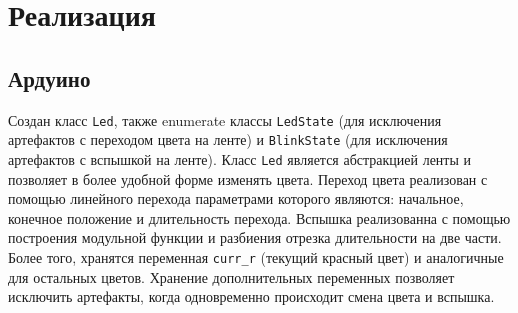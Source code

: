 \section*{Реализация}

\subsection*{Ардуино}
Создан класс \verb|Led|, также enumerate классы \verb|LedState| (для исключения артефактов с переходом цвета на ленте) и \verb|BlinkState| (для исключения артефактов с вспышкой на ленте). Класс \verb|Led| является абстракцией ленты и позволяет в более удобной форме изменять цвета. Переход цвета реализован с помощью линейного перехода параметрами которого являются: начальное, конечное положение и длительность перехода. Вспышка реализованна с помощью построения модульной функции и разбиения отрезка длительности на две части. Более того, хранятся переменная \verb|curr_r| (текущий красный цвет) и аналогичные для остальных цветов. Хранение дополнительных переменных позволяет исключить артефакты, когда одновременно происходит смена цвета и вспышка.

